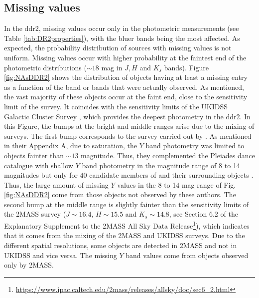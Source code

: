\subsection{Missing values}
In the \gls{ddr2}, missing values occur only in the photometric measurements (see Table \ref{tab:DR2properties}), with the bluer bands being the most affected. As expected, the probability distribution of sources with missing values is not uniform. Missing values occur with higher probability at the faintest end of the photometric distributions ($\sim 18$ mag in $J,H$ and $K_s$ bands). Figure \ref{fig:NAsDDR2} shows the distribution of objects having at least a missing entry as a function of the band or bands that were actually observed. As mentioned, the vast majority of these objects occur at the faint end, close to the sensitivity limit of the survey. It coincides with the sensitivity limits of the UKIDSS Galactic Cluster Survey \cite[$Y\sim 20.3$, $J\sim19.5$, $H\sim K_s\sim18.6$ according to][]{2007MNRAS.379.1599L}, which provides the deepest photometry in the \gls{ddr2}. In this Figure, the bumps at the bright and middle ranges arise due to the mixing of surveys. The first bump corresponds to the survey carried out by \citet{Bouy2015}. As mentioned in their Appendix A, due to saturation, the $Y$ band photometry was limited to objects fainter than $\sim 13$ magnitude. Thus, they complemented the Pleiades \gls{dance} catalogue with shallow $Y$ band photometry in the magnitude range of 8 to 14 magnitudes but only for 40 candidate members of \citet{Stauffer2007} and their surrounding objects \cite[see][for more details]{Bouy2015}. Thus, the large amount of missing $Y$ values in the 8 to 14 mag range of Fig. \ref{fig:NAsDDR2} come from those objects not observed by these authors. The second bump at the middle range is slightly fainter than the sensitivity limits of the 2MASS survey ($J\sim 16.4$, $H\sim15.5$ and $K_s \sim 14.8$, see Section 6.2 of the Explanatory Supplement to the 2MASS All Sky Data Release\footnote{\url{https://www.ipac.caltech.edu/2mass/releases/allsky/doc/sec6_2.html}}), which indicates that it comes from the mixing of the 2MASS and UKIDSS surveys. Due to the different spatial resolutions, some objects are detected in 2MASS and not in UKIDSS and vice versa. The missing $Y$ band values come from objects observed only by 2MASS.

